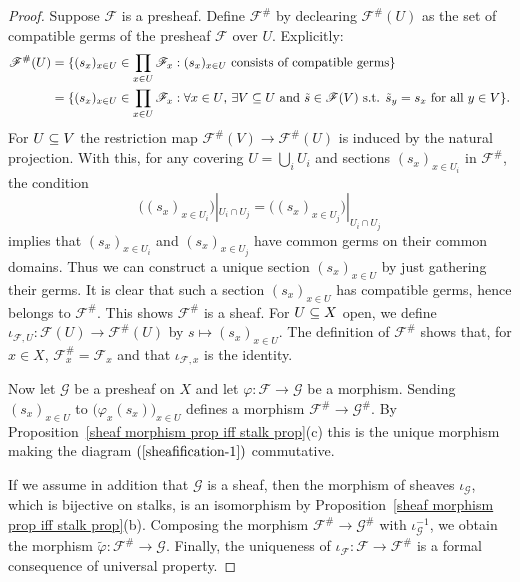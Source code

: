 \begin{proof}
Suppose $\mathscr{F}$ is a presheaf. Define $\mathscr{F}^{\#}$ by declearing $\mathscr{F}^{\#}(U)$ as the set of compatible germs of the presheaf $\mathscr{F}$ over $U$. Explicitly:
\begin{align*}
\mathscr{F}^{\#}(U)&=\{(s_x)_{x\in U}\in\prod_{x\in U}\mathscr{F}_x:\text{$(s_x)_{x\in U}$ consists of compatible germs}\}\\
&=\{(s_x)_{x\in U}\in\prod_{x\in U}\mathscr{F}_x:\text{$\forall x\in U$, $\exists V\subseteq U$ and $\tilde{s}\in\mathscr{F}(V)$ s.t. $\tilde{s}_{y}=s_x$ for all $y\in V$}\}.
\end{align*}
For $U\subseteq V$ the restriction map $\mathscr{F}^{\#}(V)\to\mathscr{F}^{\#}(U)$ is induced by the natural projection. With this, for any covering $U=\bigcup_iU_i$ and sections $(s_x)_{x\in U_i}$ in $\mathscr{F}^{\#}$, the condition
\[\big((s_x)_{x\in U_i}\big)|_{U_i\cap U_j}=\big((s_x)_{x\in U_j}\big)|_{U_i\cap U_j}\]
implies that $(s_x)_{x\in U_i}$ and $(s_x)_{x\in U_j}$ have common germs on their common domains. Thus we can construct a unique section $(s_x)_{x\in U}$ by just gathering their germs. It is clear that such a section $(s_x)_{x\in U}$ has compatible germs, hence belongs to $\mathscr{F}^{\#}$. This shows $\mathscr{F}^{\#}$ is a sheaf. For $U\subseteq X$ open, we define $\iota_{\mathscr{F},U}:\mathscr{F}(U)\to\mathscr{F}^{\#}(U)$ by $s\mapsto(s_x)_{x\in U}$. The definition of $\mathscr{F}^{\#}$ shows that, for $x\in X$, $\mathscr{F}^{\#}_x=\mathscr{F}_x$ and that $\iota_{\mathscr{F},x}$ is the identity.\par
Now let $\mathscr{G}$ be a presheaf on $X$ and let $\varphi:\mathscr{F}\to\mathscr{G}$ be a morphism. Sending $(s_x)_{x\in U}$ to $\big(\varphi_x(s_x)\big)_{x\in U}$ defines a morphism $\mathscr{F}^{\#}\to\mathscr{G}^{\#}$. By Proposition~\ref{sheaf morphism prop iff stalk prop}(c) this is the unique morphism making the diagram $(\ref{sheafification-1})$ commutative.\par
If we assume in addition that $\mathscr{G}$ is a sheaf, then the morphism of sheaves $\iota_{\mathscr{G}}$, which is bijective on stalks, is an isomorphism by Proposition~\ref{sheaf morphism prop iff stalk prop}(b). Composing the morphism $\mathscr{F}^{\#}\to\mathscr{G}^{\#}$ with $\iota_{\mathscr{G}}^{-1}$, we obtain the morphism $\tilde{\varphi}:\mathscr{F}^{\#}\to\mathscr{G}$. Finally, the uniqueness of $\iota_{\mathscr{F}}:\mathscr{F}\to\mathscr{F}^{\#}$ is a formal consequence of universal property.
\end{proof}
